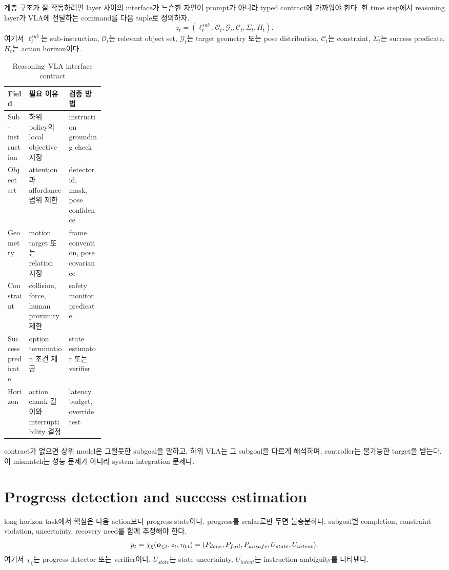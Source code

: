 계층 구조가 잘 작동하려면 layer 사이의 interface가 느슨한 자연어 prompt가 아니라 typed contract에 가까워야 한다. 한 time step에서 reasoning layer가 VLA에 전달하는 command를 다음 tuple로 정의하자.
\begin{equation}
  z_t
  =
  (
  \ell_t^{sub},
  \mathcal{O}_t,
  \mathcal{G}_t,
  \mathcal{C}_t,
  \Sigma_t,
  H_t
  ).
  \label{eq:ch17-command-contract}
\end{equation}
여기서 $\ell_t^{sub}$는 sub-instruction, $\mathcal{O}_t$는 relevant object set, $\mathcal{G}_t$는 target geometry 또는 pose distribution, $\mathcal{C}_t$는 constraint, $\Sigma_t$는 success predicate, $H_t$는 action horizon이다.

\begin{table}[h]
  \centering
  \caption{Reasoning--VLA interface contract}
  \begin{tabularx}{\linewidth}{p{0.22\linewidth}X X}
    \toprule
    Field & 필요 이유 & 검증 방법 \\
    \midrule
    Sub-instruction & 하위 policy의 local objective 지정 & instruction grounding check \\
    Object set & attention과 affordance 범위 제한 & detector id, mask, pose confidence \\
    Geometry & motion target 또는 relation 지정 & frame convention, pose covariance \\
    Constraint & collision, force, human proximity 제한 & safety monitor predicate \\
    Success predicate & option termination 조건 제공 & state estimator 또는 verifier \\
    Horizon & action chunk 길이와 interruptibility 결정 & latency budget, override test \\
    \bottomrule
  \end{tabularx}
  \label{tab:ch17-contract}
\end{table}

contract가 없으면 상위 model은 그럴듯한 subgoal을 말하고, 하위 VLA는 그 subgoal을 다르게 해석하며, controller는 불가능한 target을 받는다. 이 mismatch는 성능 문제가 아니라 system integration 문제다.

\section{Progress detection and success estimation}

long-horizon task에서 핵심은 다음 action보다 progress state이다. progress를 scalar로만 두면 불충분하다. subgoal별 completion, constraint violation, uncertainty, recovery need를 함께 추정해야 한다.
\begin{equation}
  p_t
  =
  \chi_{\xi}
  (\bm{o}_{\leq t}, z_t, \tau_{0:t})
  =
  (
  P_{done},
  P_{fail},
  P_{unsafe},
  U_{state},
  U_{intent}
  ).
  \label{eq:ch17-progress-state}
\end{equation}
여기서 $\chi_{\xi}$는 progress detector 또는 verifier이다. $U_{state}$는 state uncertainty, $U_{intent}$는 instruction ambiguity를 나타낸다.

